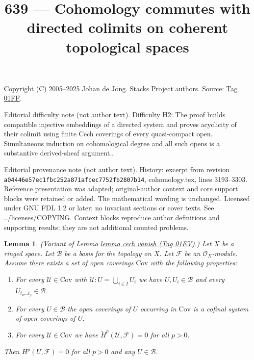 \documentclass{amsart}
\theoremstyle{plain}
\newtheorem{lemma}[subsection]{Lemma}
\theoremstyle{definition}
\theoremstyle{remark}
\numberwithin{equation}{subsection}
\begin{document}
\title[Stacks Project, Tag 01FF]{639 --- Cohomology commutes with directed colimits on coherent topological spaces}
\maketitle
\noindent Copyright (C) 2005--2025 Johan de Jong. Stacks Project authors. Source: \href{https://stacks.math.columbia.edu/tag/01FF}{Tag 01FF}.

\noindent Editorial difficulty note (not author text). Difficulty H2: The proof builds compatible injective embeddings of a directed system and proves acyclicity of their colimit using finite Cech coverings of every quasi-compact open. Simultaneous induction on cohomological degree and all such opens is a substantive derived-sheaf argument..

\noindent Editorial provenance note (not author text). History: excerpt from revision \texttt{a0444\allowbreak 6e57e\allowbreak c1fbc\allowbreak 252a8\allowbreak 71afc\allowbreak ec775\allowbreak 2fb28\allowbreak 07b14}, cohomology.tex, lines 3193--3303. Reference presentation was adapted; original-author context and core support blocks were retained or added. The mathematical wording is unchanged. Licensed under GNU FDL 1.2 or later; no invariant sections or cover texts. See ../licenses/COPYING. Context blocks reproduce author definitions and supporting results; they are not additional counted problems.

\begin{lemma}
\label{lemma-cech-vanish-basis}
(Variant of Lemma \href{https://stacks.math.columbia.edu/tag/01EV}{lemma cech vanish (Tag 01EV)}.)
Let $X$ be a ringed space.
Let $\mathcal{B}$ be a basis for the topology on $X$.
Let $\mathcal{F}$ be an $\mathcal{O}_X$-module.
Assume there exists a set of open coverings $\text{Cov}$
with the following properties:
\begin{enumerate}
\item For every $\mathcal{U} \in \text{Cov}$
with $\mathcal{U} : U = \bigcup_{i \in I} U_i$ we have
$U, U_i \in \mathcal{B}$ and every $U_{i_0 \ldots i_p} \in \mathcal{B}$.
\item For every $U \in \mathcal{B}$ the open coverings of $U$
occurring in $\text{Cov}$ is a cofinal system of open coverings
of $U$.
\item For every $\mathcal{U} \in \text{Cov}$ we have
$\check{H}^p(\mathcal{U}, \mathcal{F}) = 0$ for all $p > 0$.
\end{enumerate}
Then $H^p(U, \mathcal{F}) = 0$ for all $p > 0$ and any $U \in \mathcal{B}$.
\end{lemma}
\end{document}
